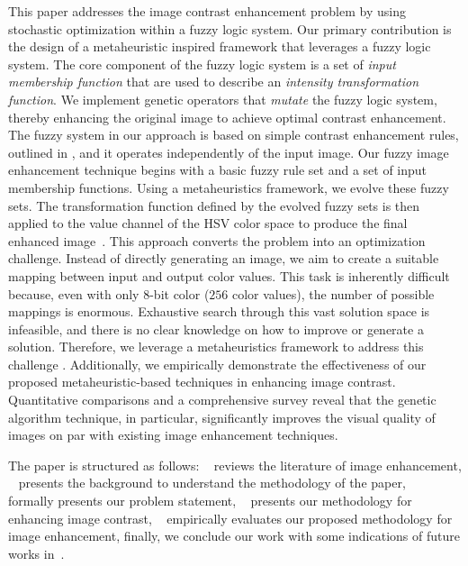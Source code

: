 This paper addresses the image contrast enhancement problem by using stochastic optimization within a fuzzy logic system. 
Our primary contribution is the design of a metaheuristic inspired framework that leverages a fuzzy logic system.
The core component of the fuzzy logic system is a set of {\em input membership function} that are used to describe an {\em intensity transformation function}. 
We implement genetic operators that {\em mutate} the fuzzy logic system, thereby enhancing the original image to achieve optimal contrast enhancement. 
The fuzzy system in our approach is based on simple contrast enhancement rules, outlined in \cite{gonzalez2008digital}, and it operates independently of the input image.
Our fuzzy image enhancement technique begins with a basic fuzzy rule set and a set of input membership functions. 
Using a metaheuristics framework, we evolve these fuzzy sets. 
The transformation function defined by the evolved fuzzy sets is then applied to the value channel of the HSV color space to produce the final enhanced image~\cite{schiller2018evaluation}. 
This approach converts the problem into an optimization challenge. 
Instead of directly generating an image, we aim to create a suitable mapping between input and output color values. 
This task is inherently difficult because, even with only $8$-bit color ($256$ color values), the number of possible mappings is enormous. 
Exhaustive search through this vast solution space is infeasible, and there is no clear knowledge on how to improve or generate a solution. 
Therefore, we leverage a metaheuristics framework to address this challenge \cite{Luke2009Metaheuristics}.
Additionally, we empirically demonstrate the effectiveness of our proposed metaheuristic-based techniques in enhancing image contrast. Quantitative comparisons and a comprehensive survey reveal that the genetic algorithm technique, in particular, significantly improves the visual quality of images on par with existing image enhancement techniques.

The paper is structured as follows:
~ reviews the literature of image enhancement,
~ presents the background to understand the methodology of the paper, 
~ formally presents our problem statement, 
~ presents our methodology for enhancing image contrast, 
~ empirically evaluates our proposed methodology for image enhancement, 
finally, we conclude our work with some indications of future works in~.

